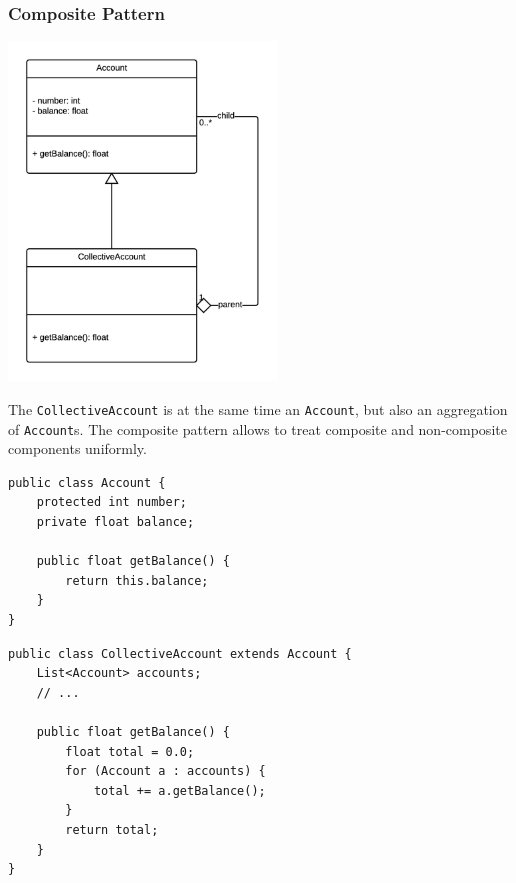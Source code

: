 \documentclass[11pt, a4paper]{article}
\newcommand{\settextlisting}{\lstset{ basicstyle=\small\ttfamily }}
\newcommand{\setcodelisting}{\lstset{ basicstyle=\footnotesize\ttfamily }}
\begin{document}
\newpage
\subsubsection*{Composite Pattern}

\centerline{\includegraphics[height=9cm]{CompositePattern.png}}

\settextlisting
The \lstinline|CollectiveAccount| is at the same time an \lstinline|Account|, but also an aggregation of \lstinline|Account|s.
The composite pattern allows to treat composite and non-composite components uniformly.

\bigskip
\setcodelisting
\begin{lstlisting}
public class Account {
	protected int number;
	private float balance;
	
	public float getBalance() {
		return this.balance;
	}
}
\end{lstlisting}


\begin{lstlisting}
public class CollectiveAccount extends Account {
	List<Account> accounts;
	// ...
	
	public float getBalance() {
		float total = 0.0;
		for (Account a : accounts) {
			total += a.getBalance();
		}
		return total;
	}
}
\end{lstlisting}
\end{document}
